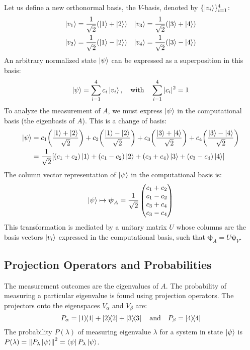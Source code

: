 \documentclass[11pt,a4paper]{article}
\begin{document}
Let us define a new orthonormal basis, the $V$-basis, denoted by $\{\ket{v_i}\}_{i=1}^4$:
\begin{align*}
    \ket{v_1} &= \frac{1}{\sqrt{2}}(\ket{1} + \ket{2}) & \ket{v_3} &= \frac{1}{\sqrt{2}}(\ket{3} + \ket{4}) \\
    \ket{v_2} &= \frac{1}{\sqrt{2}}(\ket{1} - \ket{2}) & \ket{v_4} &= \frac{1}{\sqrt{2}}(\ket{3} - \ket{4})
\end{align*}
An arbitrary normalized state $\ket{\psi}$ can be expressed as a superposition in this basis:
$$
\ket{\psi} = \sum_{i=1}^{4} c_i \ket{v_i}, \quad \text{with} \quad \sum_{i=1}^{4} |c_i|^2 = 1
$$
To analyze the measurement of $A$, we must express $\ket{\psi}$ in the computational basis (the eigenbasis of $A$). This is a change of basis:
\begin{align*}
\ket{\psi} &= c_1 \qty( \frac{\ket{1} + \ket{2}}{\sqrt{2}} ) + c_2 \qty( \frac{\ket{1} - \ket{2}}{\sqrt{2}} ) + c_3 \qty( \frac{\ket{3} + \ket{4}}{\sqrt{2}} ) + c_4 \qty( \frac{\ket{3} - \ket{4}}{\sqrt{2}} ) \\
&= \frac{1}{\sqrt{2}} \qty[ (c_1+c_2)\ket{1} + (c_1-c_2)\ket{2} + (c_3+c_4)\ket{3} + (c_3-c_4)\ket{4} ]
\end{align*}
The column vector representation of $\ket{\psi}$ in the computational basis is:
$$
\ket{\psi} \mapsto \boldsymbol{\psi}_{A} = \frac{1}{\sqrt{2}}
\begin{pmatrix}
c_1 + c_2 \\
c_1 - c_2 \\
c_3 + c_4 \\
c_3 - c_4
\end{pmatrix}
$$
This transformation is mediated by a unitary matrix $U$ whose columns are the basis vectors $\ket{v_i}$ expressed in the computational basis, such that $\boldsymbol{\psi}_A = U \boldsymbol{\psi}_V$.

\subsection{Projection Operators and Probabilities}

The measurement outcomes are the eigenvalues of $A$. The probability of measuring a particular eigenvalue is found using projection operators. The projectors onto the eigenspaces $V_\alpha$ and $V_\beta$ are:
$$
P_\alpha = \dyad{1}{1} + \dyad{2}{2} + \dyad{3}{3} \quad \text{and} \quad P_\beta = \dyad{4}{4}
$$
The probability $P(\lambda)$ of measuring eigenvalue $\lambda$ for a system in state $\ket{\psi}$ is $P(\lambda) = \norm{P_\lambda \ket{\psi}}^2 = \bra{\psi} P_\lambda \ket{\psi}$.
\end{document}
